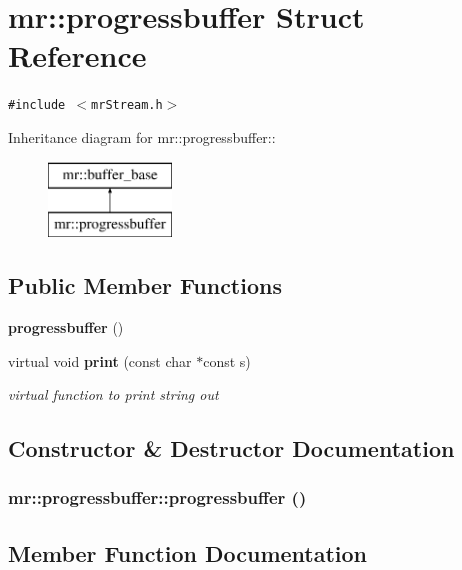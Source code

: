 \section{mr::progressbuffer Struct Reference}
\label{structmr_1_1progressbuffer}
{\tt \#include $<$mr\-Stream.h$>$}

Inheritance diagram for mr::progressbuffer::\begin{figure}[H]
\begin{center}
\leavevmode
\includegraphics[height=2cm]{structmr_1_1progressbuffer}
\end{center}
\end{figure}
\subsection*{Public Member Functions}
\begin{CompactItemize}
\item 
{\bf progressbuffer} ()
\item 
virtual void {\bf print} (const char $\ast$const s)
\begin{CompactList}\small\item\em virtual function to print string out \item\end{CompactList}\end{CompactItemize}


\subsection{Constructor \& Destructor Documentation}
\subsubsection{\setlength{\rightskip}{0pt plus 5cm}mr::progressbuffer::progressbuffer ()\hspace{0.3cm}{\tt  [inline]}}\label{structmr_1_1progressbuffer_a0}




\subsection{Member Function Documentation}
